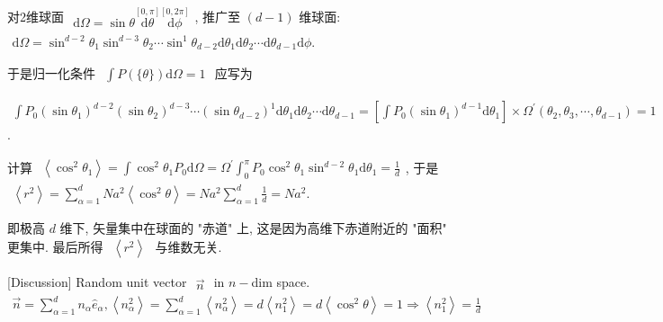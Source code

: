 \documentclass[../../main.tex]{subfiles}
\begin{document}
对2维球面 $\begin{aligned}
    \mathrm{d}\Omega = \sin{\theta}\stackrel{[0,\pi]}{\mathrm{d}\theta}\stackrel{[0,2\pi]}{\mathrm{d}\phi}
\end{aligned}$, 推广至 $(d-1)$ 维球面: $\begin{aligned}
    \mathrm{d}\Omega = \sin^{d-2}{\theta_{1}}\sin^{d-3}{\theta_{2}}\cdots\sin^{1}{\theta_{d-2}}\mathrm{d}\theta_{1}\mathrm{d}\theta_{2}\cdots\mathrm{d}\theta_{d-1}\mathrm{d}\phi. 
\end{aligned}$

于是归一化条件 $\begin{aligned}
    \int P(\{\theta\})\mathrm{d}\Omega = 1
\end{aligned}$ 应写为

$\begin{aligned}
    \int P_{0} (\sin{\theta_{1}})^{d-2}(\sin{\theta_{2}})^{d-3}\cdots(\sin{\theta_{d-2}})^{1}\mathrm{d}\theta_{1}\mathrm{d}\theta_{2}\cdots\mathrm{d}\theta_{d-1} = \left[\int P_{0}(\sin{\theta_{1}})^{d-1}\mathrm{d}\theta_{1}\right]\times \Omega^{\prime}(\theta_{2},\theta_{3},\cdots,\theta_{d-1}) = 1
\end{aligned}$. 

计算 $\begin{aligned}
    \left\langle\cos^{2}{\theta_{1}}\right\rangle 
    = \int \cos^{2}{\theta_{1}}P_{0}\mathrm{d}\Omega = \Omega^{\prime}\int_{0}^{\pi} P_{0}\cos^{2}{\theta_{1}}\sin^{d-2}{\theta_{1}}\mathrm{d}\theta_{1}
    = \frac{1}{d}
\end{aligned}$, 于是 $\begin{aligned}
    \left\langle r^{2}\right\rangle = \sum_{\alpha=1}^{d}Na^{2}\left\langle\cos^{2}{\theta}\right\rangle = Na^{2}\sum_{\alpha=1}^{d}\frac{1}{d} = Na^{2}.
\end{aligned}$

即极高 $d$ 维下, 矢量集中在球面的 "赤道" 上, 这是因为高维下赤道附近的 "面积" 更集中. 最后所得 $\begin{aligned}
    \left\langle r^{2}\right\rangle
\end{aligned}$ 与维数无关.

[Discussion] Random unit vector $\begin{aligned}
    \vec{n}
\end{aligned}$ in $n-$dim space. $\begin{aligned}
    \vec{n} = \sum_{\alpha=1}^{d}n_{\alpha}\hat{e}_{\alpha},\left\langle n_{\alpha}^{2}\right\rangle = \sum_{\alpha=1}^{d}\left\langle n_{\alpha}^{2}\right\rangle = d\left\langle n_{1}^{2}\right\rangle = d\left\langle \cos^{2}{\theta}\right\rangle = 1\Rightarrow \left\langle n_{1}^{2}\right\rangle = \frac{1}{d}
\end{aligned}$
\end{document}
